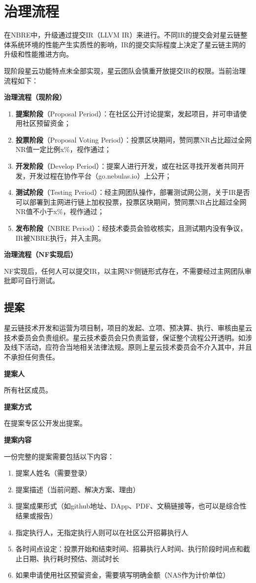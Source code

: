 \section{治理流程}
在NBRE中，升级通过提交IR（LLVM IR）来进行。不同IR的提交会对星云链整体系统环境的性能产生实质性的影响，IR的提交实际程度上决定了星云链主网的升级和性能推进方向。

现阶段星云功能特点未全部实现，星云团队会慎重开放提交IR的权限。当前治理流程如下：

\textbf{治理流程（现阶段）}	
\begin{enumerate}
\item \textbf{提案阶段}（Proposal Period）：在社区公开讨论提案，发起项目，并可申请使用社区预留资金；
\item \textbf{投票阶段}（Proposal Voting Period）：投票区块期间，赞同票NR占比超过全网NR值一定比例x\%，视作通过；
\item \textbf{开发阶段}（Develop Period）：提案人进行开发，或在社区寻找开发者共同开发，开发过程在协作平台（go.nebulas.io）上公开；
\item \textbf{测试阶段}（Testing Period）：经主网团队操作，部署测试网公测，关于IR是否可以部署到主网进行链上加权投票，投票区块期间，赞同票NR占比超过全网NR值不小于x\%，视作通过；
\item \textbf{发布阶段}（NBRE Period）：经技术委员会验收核实，且测试期内没有争议，IR被NBRE执行，并入主网。
\end{enumerate}

\textbf{治理流程（NF实现后）}

NF实现后，任何人可以提交IR，以主网NF侧链形式存在，不需要经过主网团队审批即可自行测试。

\subsection{提案}
星云链技术开发和运营为项目制，项目的发起、立项、预决算、执行、审核由星云技术委员会负责组织。星云技术委员会只负责监督，保证整个流程公开透明。如涉及线下活动，应符合当地相关法律法规。原则上星云技术委员会不介入其中，并且不承担任何责任。

\textbf{提案人}

所有社区成员。

\textbf{提案方式}

在提案专区公开发出提案。

\textbf{提案内容}

一份完整的提案需要包括以下内容：
\begin{enumerate}
\item 提案人姓名（需要登录）
\item 提案描述（当前问题、解决方案、理由）
\item 提案成果形式（如github地址、DApp、PDF、文稿链接等，也可以是综合性结果或报告）
\item 指定执行人，无指定执行人则可以在社区公开招募执行人
\item 各时间点设定：投票开始和结束时间、招募执行人时间、执行阶段时间点和截止日期、执行耗时预估、测试时长
\item 如果申请使用社区预留资金，需要填写明确金额（NAS作为计价单位）
\end{enumerate}

